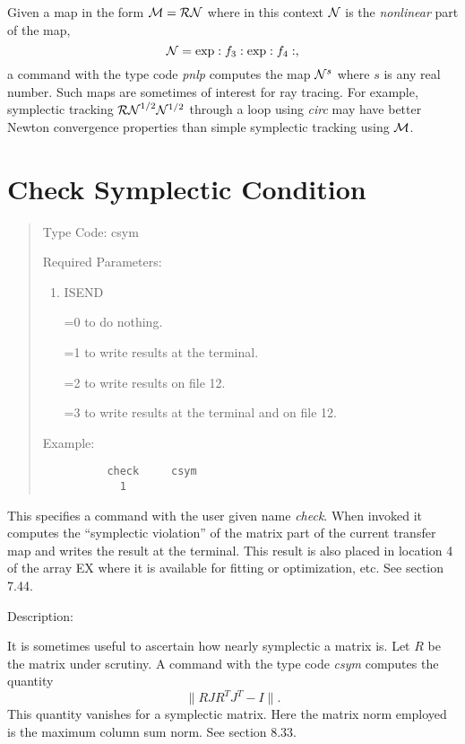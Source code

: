 Given a map in the form ${\cal M} = {\cal RN}$ where in this context ${\cal N}$ is the {\em nonlinear} part of the map,
\[
{\cal N} = \exp :f_3: \exp :f_4:,
\]
a command with the type code {\em pnlp} computes the map ${\cal N}^s$ where $s$ is any real number.  Such maps are sometimes of interest for ray tracing.  For example, symplectic tracking ${\cal RN}^{1/2}{\cal N}^{1/2}$ through a loop using {\em circ} may have better Newton convergence properties than simple symplectic tracking using ${\cal M}$.

\newpage
\section{Check Symplectic Condition}  
\begin{quotation}
\noindent Type Code:  csym
\vspace{5mm}

\noindent Required Parameters:
\begin{enumerate}
\item  ISEND

=0 to do nothing.

=1 to write results at the terminal.

=2 to write results on file 12.

=3 to write results at the terminal and on file 12.
\end{enumerate}

\vspace{5mm}
\noindent Example:
\begin{verbatim}
          check     csym
            1
\end{verbatim}
\end{quotation}
This specifies a command with the user given name {\em check}.  When invoked it computes the ``symplectic violation'' of the matrix part of the current transfer map and writes the result at the terminal.  This result is also placed in location 4 of the array EX where it is available for fitting or optimization, etc.  See section 7.44.

\vspace{5mm}
   Description:
\vspace{2mm}

It is sometimes useful to ascertain how nearly symplectic a matrix is.  Let $R$ be the matrix under scrutiny.  A command with the type code {\em csym} computes the quantity
\[
\parallel RJR^TJ^T-I\parallel .
\]
This quantity vanishes for a symplectic matrix.  Here the matrix norm employed is the maximum column sum norm.  See section 8.33.

